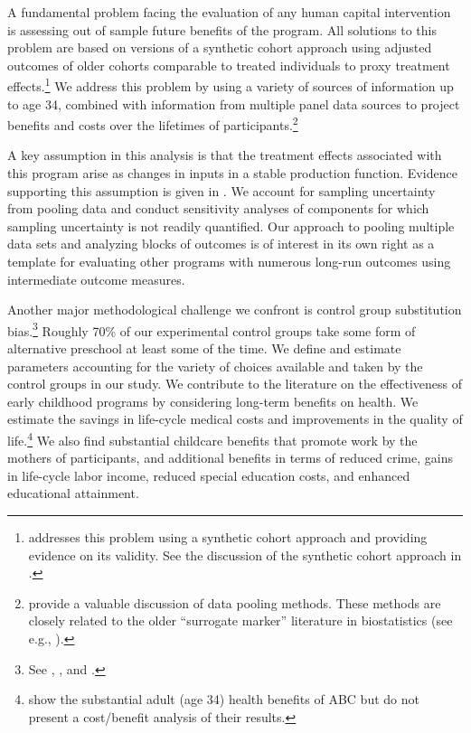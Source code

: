 A fundamental problem facing the evaluation of any human capital intervention is assessing out of sample future benefits of the program. All solutions to this problem are based on versions of a synthetic cohort approach using adjusted outcomes of older cohorts comparable to treated individuals to proxy treatment effects.\footnote{\cite{Mincer_1974_schooling} addresses this problem using a synthetic cohort approach and providing evidence on its validity. See the discussion of the synthetic cohort approach in \cite{Heckman_Lochner_ea_2006_HEE}.} We address this problem by using a variety of sources of information up to age 34, combined with information from multiple panel data sources to project benefits and costs over the lifetimes of participants.\footnote{\citet{Ridder_Moffitt_2007_hbk_metricsdata} provide a valuable discussion of data pooling methods. These methods are closely related to the older ``surrogate marker'' literature in biostatistics (see e.g., \citealp{Prentice_1989_Surrogate_SiM}).}

A key assumption in this analysis is that the treatment effects associated with this program arise as changes in inputs in a stable production function. Evidence supporting this assumption is given in \citet{Heckman_Pinto_etal_2013_PerryFactor}. We account for sampling uncertainty from pooling data and conduct sensitivity analyses of components for which sampling uncertainty is not readily quantified. Our approach to pooling multiple data sets and analyzing blocks of outcomes is of interest in its own right as a template for evaluating other programs with numerous long-run outcomes using intermediate outcome measures.

Another major methodological challenge we confront is control group substitution bias.\footnote{See \cite{Heckman_1992_randomization}, \cite{Heckman_Hohmann_etal_2000_QJE}, and \cite{Kline_Walters_2016_QJE}.} Roughly 70\% of our experimental control groups take some form of alternative preschool at least some of the time. We define and estimate parameters accounting for the variety of choices available and taken by the control groups in our study. We contribute to the literature on the effectiveness of early childhood programs by considering long-term benefits on health. We estimate the savings in life-cycle medical costs and improvements in the quality of life.\footnote{\cite{Campbell_Conti_etal_2014_EarlyChildhoodInvestments} show the substantial adult (age 34) health benefits of ABC but do not present a cost/benefit analysis of their results.} We also find substantial childcare benefits that promote work by the mothers of participants, and additional benefits in terms of reduced crime, gains in life-cycle labor income, reduced special education costs, and enhanced educational attainment.

